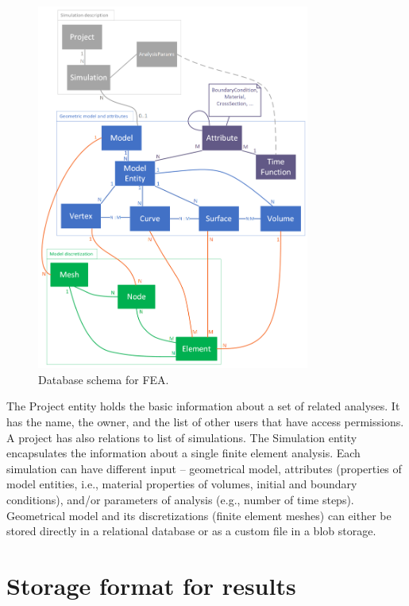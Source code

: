 \begin{figure}[H]
    \centering
    \includegraphics[width=0.8\textwidth]{figures/chapter-data-management/FEA-database-schema}
    \decoRule
    \caption{Database schema for FEA.}
    \label{fig:FEA-db-schema}
\end{figure}

The Project entity holds the basic information about a set of related analyses. It has the name, the owner, and the list of other users that have access permissions. A project has also relations to list of simulations. The Simulation entity encapsulates the information about a single finite element analysis. Each simulation can have different input -- geometrical model, attributes (properties of model entities, i.e., material properties of volumes, initial and boundary conditions), and/or parameters of analysis (e.g., number of time steps). Geometrical model and its discretizations (finite element meshes) can either be stored directly in a relational database or as a custom file in a blob storage.


\section{Storage format for results}
\label{sec:storage-format}

